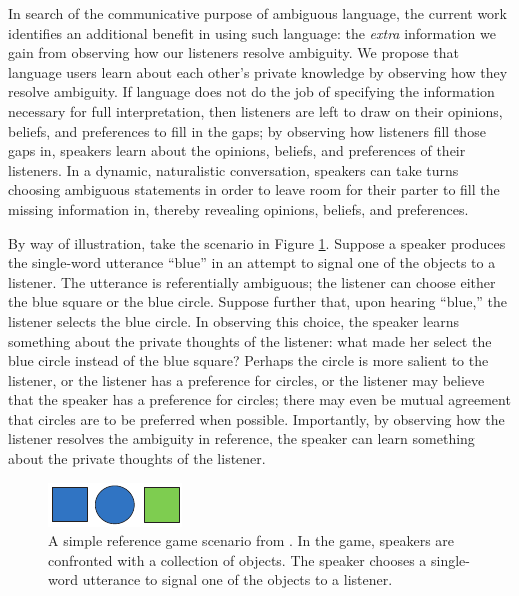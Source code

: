 \documentclass[10pt,a4paper]{article}
\begin{document}
In search of the communicative purpose of ambiguous language, the current work identifies an additional benefit in using such language: the \emph{extra} information we gain from observing how our listeners resolve ambiguity.
We propose that language users learn about each other's private knowledge by observing how they resolve ambiguity. If language does not do the job of specifying the information necessary for full interpretation, then listeners are left to draw on their opinions, beliefs, and preferences to fill in the gaps; by observing how listeners fill those gaps in, speakers learn about the opinions, beliefs, and preferences of their listeners.
In a dynamic, naturalistic conversation, speakers can take turns choosing ambiguous statements in order to leave room for their parter to fill the missing information in, thereby revealing opinions, beliefs, and preferences. 


By way of illustration, take the scenario in Figure \ref{FG-ref-game}.
Suppose a speaker produces the single-word utterance ``blue'' in an attempt to signal one of the objects to a listener. The utterance is referentially ambiguous; the listener can choose either the blue square or the blue circle. Suppose further that, upon hearing ``blue,'' the listener selects the blue circle. In observing this choice, the speaker learns something about the private thoughts of the listener: what made her select the blue circle instead of the blue square? Perhaps the circle is more salient to the listener, or the listener has a preference for circles, or the listener may believe that the speaker has a preference for circles; there may even be mutual agreement that circles are to be preferred when possible. Importantly, by observing how the listener resolves the ambiguity in reference, the speaker can learn something about the private thoughts of the listener. 

\begin{figure}
	\centering
	\includegraphics[width=.5\linewidth]{images/rsascene-eps-converted-to.pdf}
	\caption{A simple reference game scenario from \protect{}.
		In the game, speakers are confronted with a collection of objects. 
		The speaker chooses a single-word utterance to signal one of the objects to a listener.
		}
	\label{FG-ref-game}
\end{figure}
\end{document}
